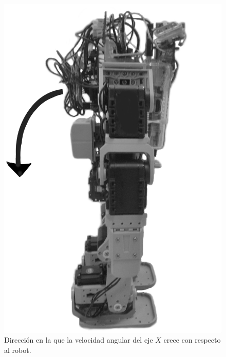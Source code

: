 \begin{figure}[hbtp]
\centering
\includegraphics[scale=0.06]{imagenes/robotLateral.jpg}
\caption{Dirección en la que la velocidad angular del eje $X$ crece con respecto al robot.}
\label{fig:gyroDireccion1}
\end{figure}



